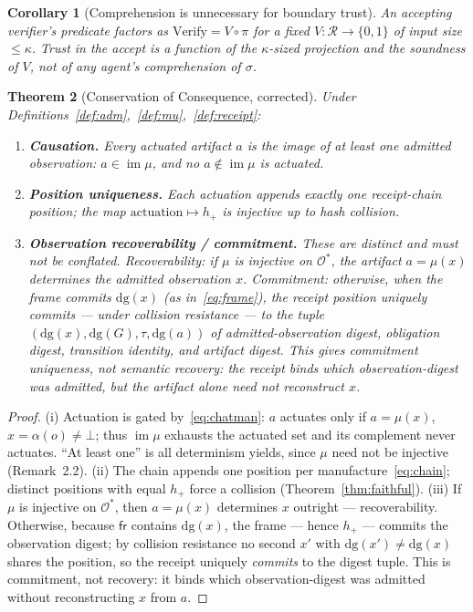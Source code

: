 \documentclass[11pt,oneside]{book}
\theoremstyle{definition}
\theoremstyle{plain}
\newtheorem{theorem}{Theorem}[chapter]
\newtheorem{corollary}[theorem]{Corollary}
\theoremstyle{remark}
\newcommand{\Adm}{\mathcal{O}^{*}}             %
\newcommand{\Recs}{\mathcal{R}}                %
\newcommand{\Proj}{\pi}                        %
\newcommand{\muop}{\mu}                        %
\newcommand{\adm}{\alpha}                      %
\newcommand{\Rfsl}{\bot}                       %
\newcommand{\CL}{\kappa}                       %
\newcommand{\dg}{\mathrm{dg}}                  %
\DeclareMathOperator{\im}{im}
\begin{document}
\begin{corollary}[Comprehension is unnecessary for boundary trust]\label{cor:noncomp}
An accepting verifier's predicate factors as $\mathrm{Verify}=V\circ\Proj$ for a fixed
$V:\Recs\to\{0,1\}$ of input size $\le\CL$. Trust in the accept is a function of the
$\CL$-sized projection and the soundness of $V$, not of any agent's comprehension of $\sigma$.
\end{corollary}

\begin{theorem}[Conservation of Consequence, corrected]\label{thm:conservation}
Under Definitions~\ref{def:adm},~\ref{def:mu},~\ref{def:receipt}:
\begin{enumerate}[label=(\roman*),leftmargin=*]
\item \textbf{Causation.} Every actuated artifact $a$ is the image of \emph{at least one}
admitted observation: $a\in\im\muop$, and no $a\notin\im\muop$ is actuated.
\item \textbf{Position uniqueness.} Each actuation appends \emph{exactly one} receipt-chain
position; the map $\text{actuation}\mapsto h_+$ is injective up to hash collision.
\item \textbf{Observation recoverability / commitment.} These are distinct and must not be
conflated. \emph{Recoverability:} if $\muop$ is injective on $\Adm$, the artifact
$a=\muop(x)$ determines the admitted observation $x$. \emph{Commitment:} otherwise, when the
frame commits $\dg(x)$ (as in~\eqref{eq:frame}), the receipt position uniquely commits ---
under collision resistance --- to the tuple $(\dg(x),\dg(G),\tau,\dg(a))$ of
admitted-observation digest, obligation digest, transition identity, and artifact digest.
This gives \emph{commitment} uniqueness, not \emph{semantic recovery}: the receipt binds
which observation-digest was admitted, but the artifact alone need not reconstruct $x$.
\end{enumerate}
\end{theorem}

\begin{proof}
(i) Actuation is gated by~\eqref{eq:chatman}: $a$ actuates only if $a=\muop(x)$, $x=\adm(o)\ne
\Rfsl$; thus $\im\muop$ exhausts the actuated set and its complement never actuates. ``At least
one'' is all determinism yields, since $\muop$ need not be injective (Remark~2.2).
(ii) The chain appends one position per manufacture~\eqref{eq:chain}; distinct positions with
equal $h_+$ force a collision (Theorem~\ref{thm:faithful}).
(iii) If $\muop$ is injective on $\Adm$, then $a=\muop(x)$ determines $x$ outright ---
recoverability. Otherwise, because $\mathsf{fr}$ contains $\dg(x)$, the frame --- hence $h_+$
--- commits the observation digest; by collision resistance no second $x'$ with
$\dg(x')\ne\dg(x)$ shares the position, so the receipt uniquely \emph{commits} to the digest
tuple. This is commitment, not recovery: it binds which observation-digest was admitted
without reconstructing $x$ from $a$. \end{proof}
\end{document}
